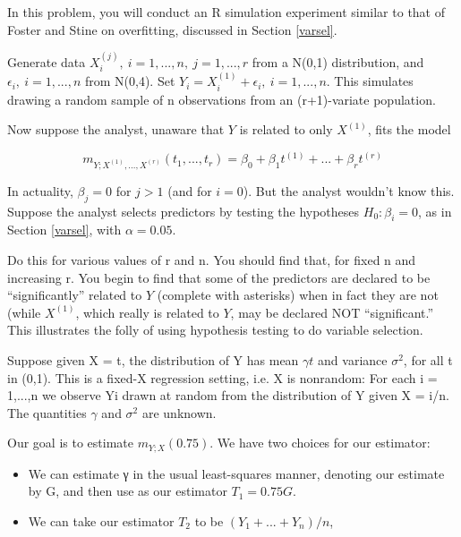 \oneproblem In this problem, you will conduct an R simulation experiment
similar to that of Foster and Stine on overfitting, discussed in Section
\ref{varsel}.  

Generate data $X_i^{(j)}, ~ i = 1,...,n, ~ j = 1,...,r$ from a N(0,1)
distribution, and $\epsilon_i, ~ i = 1,...,n$ from N(0,4).  Set
$Y_i = X_i^{(1)} + \epsilon_i, ~ i = 1,...,n$.  This simulates drawing a
random sample of n observations from an (r+1)-variate population.

Now suppose the analyst, unaware that $Y$ is related to only $X^{(1)}$,
fits the model

\begin{equation}
m_{Y;X^{(1)},...,X^{(r)}}(t_1,...,t_r) =
\beta_0 + \beta_1 t^{(1)} + ... + \beta_r t^{(r)}
\end{equation}

In actuality, $\beta_j = 0$ for $j > 1$ (and for $i = 0$).
But the analyst wouldn't know this. Suppose the analyst selects    
predictors by testing the hypotheses $H_0: \beta_i = 0$, as in Section
\ref{varsel}, with $\alpha = 0.05$.

Do this for various values of r and n. You should find that, for fixed n
and increasing r.  You begin to find that some of the predictors are
declared to be ``significantly'' related to $Y$ (complete with
asterisks) when in fact they are not  (while $X^{(1)}$, which really is
related to $Y$, may be declared NOT ``significant.''  This illustrates
the folly of using hypothesis testing to do variable selection.

\oneproblem
Suppose given X = t, the distribution of Y has mean $\gamma t$ and
variance $\sigma^2$, for all t in (0,1). This is a fixed-X regression
setting, i.e. X is nonrandom: For each i = 1,...,n we observe Yi drawn
at random from the distribution of Y given X = i/n. The quantities
$\gamma$ and $\sigma^2$ are unknown.

Our goal is to estimate $m_{Y;X}(0.75)$. We have two choices for our estimator:

\begin{itemize}

\item We can estimate γ in the usual least-squares manner, denoting our
estimate by G, and then use as our estimator $T_1 = 0.75 G$.
    
\item We can take our estimator $T_2$ to be 
$(Y_1+...+Y_n)/n$,

\end{itemize}

